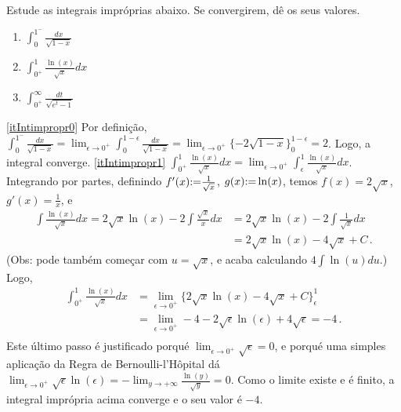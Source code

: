 \begin{exo}
Estude as integrais impróprias abaixo. Se convergirem, dê os seus valores.
\begin{multicols}{3}
\begin{enumerate}
\item\label{itIntimpropr0} ${\int_{0}^{1^-}\frac{dx}{\sqrt{1-x}}}$
\item\label{itIntimpropr1} ${\int_{0^+}^1\frac{\ln(x)}{\sqrt{x}}dx}$
\item\label{itIntimpropr2}  $\int_{0^+}^\infty\frac{dt}{\sqrt{e^t-1}}$
\end{enumerate}
\end{multicols}
\vspace{0.01cm}
\begin{sol}
\eqref{itIntimpropr0} Por definição,
$\int_{0}^{1^-}\frac{dx}{\sqrt{1-x}}=\lim_{\epsilon\to
0^+}\int_0^{1-\epsilon}\frac{dx}{\sqrt{1-x}}=
\lim_{\epsilon\to 0^+}\{-2\sqrt{1-x}\}_0^{1-\epsilon}=2$. Logo, a integral
converge.
\eqref{itIntimpropr1} $\int_{0^+}^1\frac{\ln(x)}{\sqrt{x}}dx=\lim_{\epsilon\to
0^+}\int_\epsilon^1\frac{\ln(x)}{\sqrt{x}}dx$.
Integrando por partes, definindo $f'(x){:=} \frac{1}{\sqrt{x}}$, $g(x){:=}
\ln
(x)$, temos $f(x)=2\sqrt{x}$, $g'(x)=\frac{1}{x}$, e
\begin{align*}
\int \frac{\ln(x)}{\sqrt{x}}dx
=2\sqrt{x}\ln (x)-2\int \frac{\sqrt{x}}{x}dx
&=2\sqrt{x}\ln (x)-2\int \frac{1}{\sqrt{x}}dx\\
&=2\sqrt{x}\ln (x)-4\sqrt{x}+C\,.
\end{align*}
(Obs: pode também começar com $u=\sqrt{x}$, e acaba calculando $4\int
\ln(u)du$.)
Logo,
\begin{align*}
\int_{0^+}^1\frac{\ln(x)}{\sqrt{x}}dx&=\lim_{\epsilon\to 0^+}
\big\{
2\sqrt{x}\ln (x)-4\sqrt{x}+C
\big\}_\epsilon^1\\
&=\lim_{\epsilon\to 0^+}
-4-2\sqrt{\epsilon}\ln (\epsilon)+4\sqrt{\epsilon}=-4\,.\\
\end{align*}
Este último passo é justificado porqué $\lim_{\epsilon\to
0^+}\sqrt{\epsilon}=0$, e porqué uma simples aplicação da Regra de
Bernoulli-l'Hôpital dá $\lim_{\epsilon\to 0^+}\sqrt{\epsilon}\ln
(\epsilon)=-\lim_{y\to +\infty}\frac{\ln (y)}{\sqrt{y}}=0$.
Como o limite existe e é finito, a integral imprópria acima { converge e o
seu valor é $-4$}.


\end{sol}
\end{exo}
